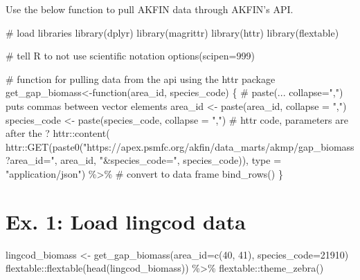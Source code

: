 \documentclass[
  letterpaper,
  oneside,
  open=any]{scrbook}
\newenvironment{Shaded}{\begin{snugshade}}{\end{snugshade}}
\newcommand{\AttributeTok}[1]{\textcolor[rgb]{0.40,0.45,0.13}{#1}}
\newcommand{\CommentTok}[1]{\textcolor[rgb]{0.37,0.37,0.37}{#1}}
\newcommand{\ControlFlowTok}[1]{\textcolor[rgb]{0.00,0.23,0.31}{#1}}
\newcommand{\DecValTok}[1]{\textcolor[rgb]{0.68,0.00,0.00}{#1}}
\newcommand{\FunctionTok}[1]{\textcolor[rgb]{0.28,0.35,0.67}{#1}}
\newcommand{\NormalTok}[1]{\textcolor[rgb]{0.00,0.23,0.31}{#1}}
\newcommand{\OtherTok}[1]{\textcolor[rgb]{0.00,0.23,0.31}{#1}}
\newcommand{\SpecialCharTok}[1]{\textcolor[rgb]{0.37,0.37,0.37}{#1}}
\newcommand{\StringTok}[1]{\textcolor[rgb]{0.13,0.47,0.30}{#1}}
\begin{document}
Use the below function to pull AKFIN data through AKFIN's API.

\begin{Shaded}
\begin{Highlighting}[]
\CommentTok{\# load libraries}
\FunctionTok{library}\NormalTok{(dplyr)}
\FunctionTok{library}\NormalTok{(magrittr)}
\FunctionTok{library}\NormalTok{(httr)}
\FunctionTok{library}\NormalTok{(flextable)}

\CommentTok{\# tell R to not use scientific notation}
\FunctionTok{options}\NormalTok{(}\AttributeTok{scipen=}\DecValTok{999}\NormalTok{)}

\CommentTok{\# function for pulling data from the api using the httr package}
\NormalTok{get\_gap\_biomass}\OtherTok{\textless{}{-}}\ControlFlowTok{function}\NormalTok{(area\_id, species\_code) \{}
  \CommentTok{\# paste(... collapse=",") puts commas between vector elements}
\NormalTok{  area\_id }\OtherTok{\textless{}{-}} \FunctionTok{paste}\NormalTok{(area\_id, }\AttributeTok{collapse =} \StringTok{","}\NormalTok{)}
\NormalTok{  species\_code }\OtherTok{\textless{}{-}} \FunctionTok{paste}\NormalTok{(species\_code, }\AttributeTok{collapse =} \StringTok{","}\NormalTok{)}
  \CommentTok{\# httr code, parameters are after the \textquotesingle{}?\textquotesingle{}}
\NormalTok{  httr}\SpecialCharTok{::}\FunctionTok{content}\NormalTok{(}
\NormalTok{    httr}\SpecialCharTok{::}\FunctionTok{GET}\NormalTok{(}\FunctionTok{paste0}\NormalTok{(}\StringTok{"https://apex.psmfc.org/akfin/data\_marts/akmp/gap\_biomass?area\_id="}\NormalTok{,}
\NormalTok{                     area\_id,}
                     \StringTok{"\&species\_code="}\NormalTok{,}
\NormalTok{                     species\_code)),}
    \AttributeTok{type =} \StringTok{"application/json"}\NormalTok{) }\SpecialCharTok{\%\textgreater{}\%}
    \CommentTok{\# convert to data frame}
    \FunctionTok{bind\_rows}\NormalTok{()}
\NormalTok{\}}
\end{Highlighting}
\end{Shaded}

\hypertarget{ex.-1-load-lingcod-data}{%
\section{Ex. 1: Load lingcod data}\label{ex.-1-load-lingcod-data}}

\begin{Shaded}
\begin{Highlighting}[]
\NormalTok{lingcod\_biomass }\OtherTok{\textless{}{-}} \FunctionTok{get\_gap\_biomass}\NormalTok{(}\AttributeTok{area\_id=}\FunctionTok{c}\NormalTok{(}\DecValTok{40}\NormalTok{, }\DecValTok{41}\NormalTok{), }\AttributeTok{species\_code=}\DecValTok{21910}\NormalTok{)}
\NormalTok{flextable}\SpecialCharTok{::}\FunctionTok{flextable}\NormalTok{(}\FunctionTok{head}\NormalTok{(lingcod\_biomass)) }\SpecialCharTok{\%\textgreater{}\%}
\NormalTok{  flextable}\SpecialCharTok{::}\FunctionTok{theme\_zebra}\NormalTok{()}
\end{Highlighting}
\end{Shaded}
\end{document}
